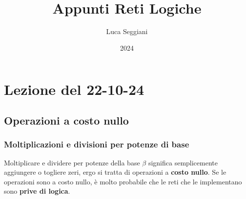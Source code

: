 \documentclass[a4paper,11pt]{article}
\title{Appunti Reti Logiche}
\author{Luca Seggiani}
\date{2024}
\begin{document}
\section{Lezione del 22-10-24}

\thispagestyle{empty}
\pagestyle{fancy}

\subsection{Operazioni a costo nullo}
\subsubsection{Moltiplicazioni e divisioni per potenze di base}
Moltiplicare e dividere per potenze della base $\beta$ significa semplicemente aggiungere o togliere zeri, ergo si tratta di operazioni a \textbf{costo nullo}.
Se le operazioni sono a costo nullo, è molto probabile che le reti che le implementano sono \textbf{prive di logica}.
\end{document}
